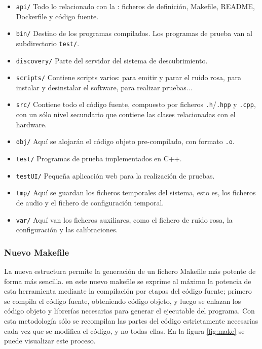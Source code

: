 \begin{itemize}
	\item \texttt{api/}
	\subitem Todo lo relacionado con la : ficheros de definición, Makefile, README, Dockerfile y código fuente.

	\item \texttt{bin/}
	\subitem Destino de los programas compilados. Los programas de prueba van al subdirectorio \texttt{test/}.

	\item \texttt{discovery/}
	\subitem Parte del servidor del sistema de descubrimiento.

	\item \texttt{scripts/}
	\subitem Contiene scripts varios: para emitir y parar el ruido rosa, para instalar y desinstalar el software, para realizar pruebas...

	\item \texttt{src/}
	\subitem Contiene todo el código fuente, compuesto por ficheros \texttt{.h}/\texttt{.hpp} y \texttt{.cpp}, con un sólo nivel secundario que contiene las clases relacionadas con el hardware.

	\item \texttt{obj/}
	\subitem Aquí se alojarán el código objeto pre-compilado, con formato \texttt{.o}.

	\item \texttt{test/}
	\subitem Programas de prueba implementados en C++.

	\item \texttt{testUI/}
	\subitem Pequeña aplicación web para la realización de pruebas.

	\item \texttt{tmp/}
	\subitem Aquí se guardan los ficheros temporales del sistema, esto es, los ficheros de audio y el fichero de configuración temporal.

	\item \texttt{var/}
	\subitem Aquí van los ficheros auxiliares, como el fichero de ruido rosa, la configuración y las calibraciones.
\end{itemize}

\subsubsection{Nuevo Makefile}

La nueva estructura permite la generación de un fichero Makefile más potente de forma más sencilla. en este nuevo makefile se exprime al máximo la potencia de esta herramienta mediante la compilación por etapas del código fuente; primero se compila el código fuente, obteniendo código objeto, y luego se enlazan los código objeto y librerías necesarias para generar el ejecutable del programa. Con esta metodología sólo se recompilan las partes del código estrictamente necesarias cada vez que se modifica el código, y no todas ellas. En la figura \ref{fig:make} se puede visualizar este proceso.

